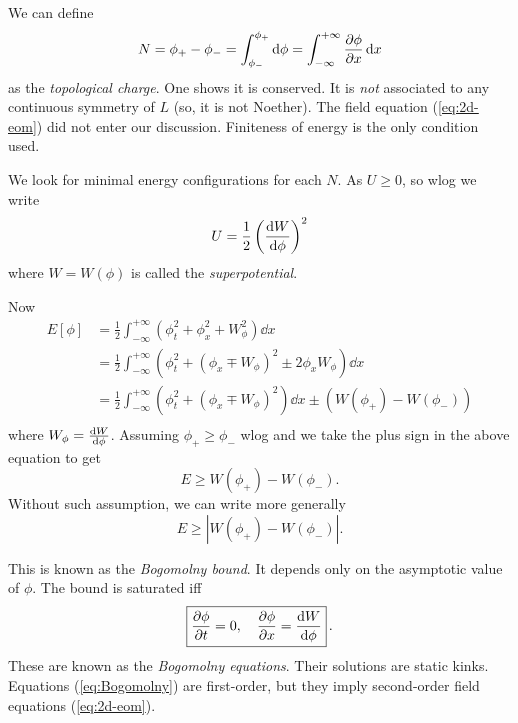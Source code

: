 \documentclass[a4paper,11pt]{article}
\begin{document}
    We can define 
    \begin{equation}
        N = \phi_+ - \phi_- = \int_{\phi_-}^{\phi_+} \dd{\phi} = \int_{-\infty}^{+\infty} \pdv{\phi}{x} \dd{x}
    \end{equation}
    as the \emph{topological charge}. One shows it is conserved. It is \emph{not} associated to any continuous symmetry of $L$ (so, it is not Noether). The field equation (\ref{eq:2d-eom}) did not enter our discussion. Finiteness of energy is the only condition used.
    
    We look for minimal energy configurations for each $N$. As $U \geq 0$, so wlog we write 
    \begin{equation}
        U = \frac{1}{2} \left( \dv{W}{\phi} \right)^2
    \end{equation}
    where $W = W(\phi)$ is called the \emph{superpotential}.

    Now 
    \begin{equation}
        \begin{split}
            E[\phi] & = \frac{1}{2} \int_{-\infty}^{+\infty} \left( \phi_t^2 + \phi_x^2 + W_\phi^2 \right) \dd{x}\\
            & = \frac{1}{2} \int_{-\infty}^{+\infty} \left( \phi_t^2 + \left( \phi_x \mp W_\phi \right)^2 \pm 2 \phi_x W_\phi\right) \dd{x}\\
            & = \frac{1}{2} \int_{-\infty}^{+\infty} \left( \phi_t^2 + \left( \phi_x \mp W_\phi \right)^2 \right) \dd{x} \pm \left( W(\phi_+) - W(\phi_-) \right)\\
        \end{split}
    \end{equation}
    where $W_\phi = \dv{W}{\phi}$. Assuming $\phi_+ \geq \phi_-$ wlog and we take the plus sign in the above equation to get 
    \begin{equation}
        E \geq W(\phi_+) - W(\phi_-).
    \end{equation}
    Without such assumption, we can write more generally 
    \begin{equation}
        E \geq |W(\phi_+) - W(\phi_-)|.
    \end{equation}

    This is known as the \emph{Bogomolny bound}. It depends only on the asymptotic value of $\phi$. The bound is saturated iff 
    \begin{equation}
        \boxed{\pdv{\phi}{t} = 0, \quad \pdv{\phi}{x} = \dv{W}{\phi}}\,. \label{eq:Bogomolny}
    \end{equation}
    These are known as the \emph{Bogomolny equations}. Their solutions are static kinks. Equations (\ref{eq:Bogomolny}) are first-order, but they imply second-order field equations (\ref{eq:2d-eom}).
\end{document}
